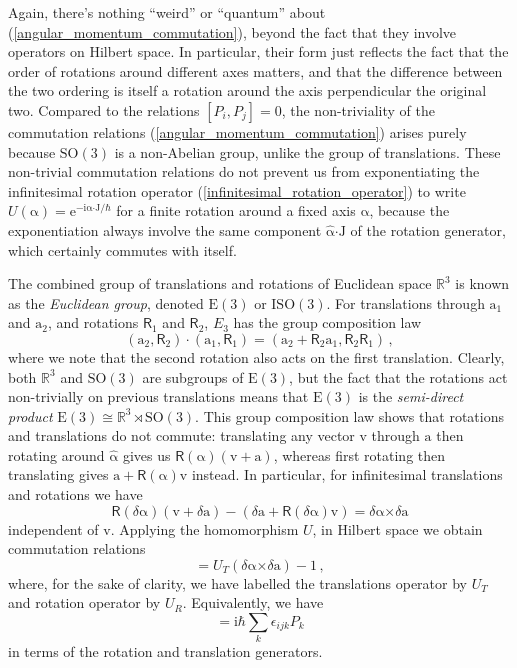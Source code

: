 \documentclass{article}
\theoremstyle{plain}\theoremheaderfont{\normalfont\itshape}\theorembodyfont{\rmfamily}\theoremseparator{.}\newtheorem*{rem}{Remark}\newtheorem*{ex}{Example}\newtheorem*{proof}{Proof}\newtheorem*{altp}{Alternative proof}
\theoremstyle{plain}\theoremheaderfont{\normalfont\bfseries}\theorembodyfont{\rmfamily}\theoremseparator{.}\newtheorem{thm}{Theorem}[section]\newtheorem{lem}[thm]{Lemma}\newtheorem{prop}[thm]{Proposition}\newtheorem*{cor}{Corollary}\newtheorem{defn}[thm]{Definition}\newtheorem{clm}[thm]{Claim}\newtheorem{clminproof}{Claim}
\theoremstyle{break}\theoremheaderfont{\normalfont\itshape}\theorembodyfont{\rmfamily}\theoremseparator{.\medskip}\newtheorem*{proofskip}{Proof}\newtheorem*{exs}{Examples}\newtheorem*{rems}{Remarks}
\theoremstyle{break}\theoremheaderfont{\normalfont\bfseries}\theorembodyfont{\rmfamily}\theoremseparator{.\medskip}\newtheorem{lemskip}[thm]{Lemma}\newtheorem{defnskip}[thm]{Definition}\newtheorem{propskip}[thm]{Proposition}\newtheorem{thmskip}[thm]{Theorem}
\numberwithin{equation}{section}
\newcommand{\ii}{\mathrm{i}}
\newcommand{\ee}{\mathrm{e}}
\newcommand{\vb}[1]{\bm{\mathrm{#1}}}
\newcommand{\cross}{\bm{\times}}
\newcommand{\vdot}{\bm{\cdot}}
\newcommand{\RR}{\mathbb{R}}
\newcommand{\SO}{\mathrm{SO}}
\newcommand{\E}{\mathrm{E}}
\begin{document}
    Again, there's nothing ``weird'' or ``quantum'' about (\ref{angular_momentum_commutation}), beyond the fact that they involve operators on Hilbert space. In particular, their form just reflects the fact that the order of rotations around different axes matters, and that the difference between the two ordering is itself a rotation around the axis perpendicular the original two. Compared to the relations \([P_i,P_j]=0\), the non-triviality of the commutation relations (\ref{angular_momentum_commutation}) arises purely because \(\SO(3)\) is a non-Abelian group, unlike the group of translations. These non-trivial commutation relations do not prevent us from exponentiating the infinitesimal rotation operator (\ref{infinitesimal_rotation_operator}) to write \(U(\vb{\alpha})=\ee^{-\ii \vb{\alpha}\vdot\vb{J}/\hbar}\) for a finite rotation around a fixed axis \(\vb{\alpha}\), because the exponentiation always involve the same component \(\hat{\vb{\alpha}}\vdot\vb{J}\) of the rotation generator, which certainly commutes with itself.

    The combined group of translations and rotations of Euclidean space \(\RR^3\) is known as the \textit{Euclidean group}, denoted \(\E(3)\) or \(\mathrm{ISO}(3)\). For translations through \(\vb{a}_1\) and \(\vb{a}_2\), and rotations \(\mathsf{R}_1\) and \(\mathsf{R}_2\), \(E_3\) has the group composition law
    \begin{equation}
        (\vb{a}_2,\mathsf{R}_2)\cdot(\vb{a}_1,\mathsf{R}_1)=(\vb{a}_2+\mathsf{R}_2\vb{a}_1,\mathsf{R}_2\mathsf{R}_1)\,,
    \end{equation}
    where we note that the second rotation also acts on the first translation. Clearly, both \(\RR^3\) and \(\SO(3)\) are subgroups of \(\E(3)\), but the fact that the rotations act non-trivially on previous translations means that \(\E(3)\) is the \textit{semi-direct product} \(\E(3)\cong\RR^3\rtimes \SO(3)\). This group composition law shows that rotations and translations do not commute: translating any vector \(\vb{v}\) through \(\vb{a}\) then rotating around \(\hat{\vb{\alpha}}\) gives us \(\mathsf{R}(\vb{\alpha})(\vb{v}+\vb{a})\), whereas first rotating then translating gives \(\vb{a}+\mathsf{R}(\vb{\alpha})\vb{v}\) instead. In particular, for infinitesimal translations and rotations we have
    \begin{equation}
        \mathsf{R}(\delta\vb{\alpha})(\vb{v}+\delta\vb{a})-(\delta\vb{a}+\mathsf{R}(\delta\vb{\alpha})\vb{v})=\delta\vb{\alpha}\cross\delta\vb{a}
    \end{equation}
    independent of \(\vb{v}\). Applying the homomorphism \(U\), in Hilbert space we obtain commutation relations
    \begin{equation}
        [U_R(\delta\vb{\alpha}),U_T(\delta\vb{a})]=U_T(\delta\vb{\alpha}\cross\delta\vb{a})-1\,,
    \end{equation}
    where, for the sake of clarity, we have labelled the translations operator by \(U_T\) and rotation operator by \(U_R\). Equivalently, we have
    \begin{equation}
        [J_i,P_j]=\ii\hbar\sum_k \epsilon_{ijk}P_k
    \end{equation}
    in terms of the rotation and translation generators.
\end{document}
